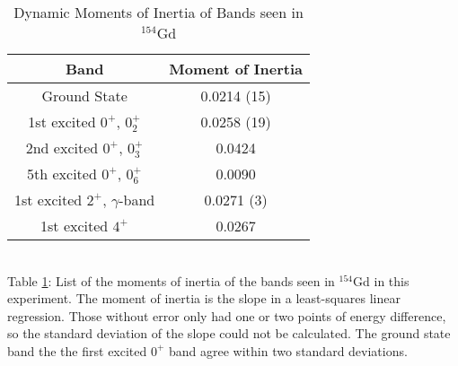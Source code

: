 \begin{table}[!]
    \centering
    \caption{Dynamic Moments of Inertia of Bands seen in $^{154}$Gd}
    \begin{tabular}{c|c}
        \toprule
        Band & Moment of Inertia  \\
        \hline
        Ground State & 0.0214 (15) \\
        1st excited $0^+$, $0^+_2$ & 0.0258 (19) \\
        2nd excited $0^+$, $0^+_3$ & 0.0424 \\
        5th excited $0^+$, $0^+_6$ & 0.0090 \\
        1st excited $2^+$, $\gamma$-band & 0.0271 (3) \\
        1st excited $4^+$ & 0.0267 \\
        \bottomrule
    \end{tabular}
    \\[2pt]
    \footnotesize
    \label{tab:154_Dynamic}
    Table \ref{tab:154_Dynamic}: List of the moments of inertia of the bands seen in $^{154}$Gd in this experiment. The moment of inertia is the slope in a least-squares linear regression. Those without error only had one or two points of energy difference, so the standard deviation of the slope could not be calculated. The ground state band the the first excited $0^+$ band agree within two standard deviations.
\end{table}